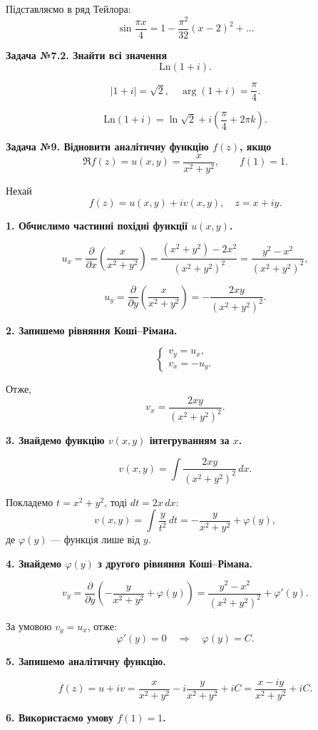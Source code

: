 \documentclass[12pt,a4paper]{article}
\begin{document}
Підставляємо в ряд Тейлора:
\[
\sin\frac{\pi x}{4}
=
1
-\frac{\pi^2}{32}(x-2)^2
+\dots
\]


\textbf{Задача №7.2. Знайти всі значення}
\[
\mathrm{Ln}(1+i).
\]

\[
|1+i|=\sqrt2,\quad \arg(1+i)=\frac{\pi}{4}.
\]

\[
\mathrm{Ln}(1+i)=\ln\sqrt2+i\left(\frac{\pi}{4}+2\pi k\right).
\]

\textbf{Задача №9. Відновити аналітичну функцію \(f(z)\), якщо}
\[
\Re f(z)=u(x,y)=\frac{x}{x^2+y^2}, \qquad f(1)=1.
\]

Нехай
\[
f(z)=u(x,y)+iv(x,y),
\quad z=x+iy.
\]

\textbf{1. Обчислимо частинні похідні функції \(u(x,y)\).}

\[
u_x=\frac{\partial}{\partial x}\!\left(\frac{x}{x^2+y^2}\right)
=\frac{(x^2+y^2)-2x^2}{(x^2+y^2)^2}
=\frac{y^2-x^2}{(x^2+y^2)^2},
\]

\[
u_y=\frac{\partial}{\partial y}\!\left(\frac{x}{x^2+y^2}\right)
=-\frac{2xy}{(x^2+y^2)^2}.
\]

\textbf{2. Запишемо рівняння Коші–Рімана.}

\[
\begin{cases}
v_y=u_x,\\
v_x=-u_y.
\end{cases}
\]

Отже,
\[
v_x=\frac{2xy}{(x^2+y^2)^2}.
\]

\textbf{3. Знайдемо функцію \(v(x,y)\) інтегруванням за \(x\).}

\[
v(x,y)=\int \frac{2xy}{(x^2+y^2)^2}\,dx.
\]

Покладемо \(t=x^2+y^2\), тоді \(dt=2x\,dx\):
\[
v(x,y)=\int \frac{y}{t^2}\,dt
=-\frac{y}{x^2+y^2}+\varphi(y),
\]
де \(\varphi(y)\) — функція лише від \(y\).

\textbf{4. Знайдемо \(\varphi(y)\) з другого рівняння Коші–Рімана.}

\[
v_y=\frac{\partial}{\partial y}
\left(-\frac{y}{x^2+y^2}+\varphi(y)\right)
=\frac{y^2-x^2}{(x^2+y^2)^2}+\varphi'(y).
\]

За умовою \(v_y=u_x\), отже:
\[
\varphi'(y)=0 \quad \Rightarrow \quad \varphi(y)=C.
\]

\textbf{5. Запишемо аналітичну функцію.}

\[
f(z)=u+iv
=\frac{x}{x^2+y^2}-i\frac{y}{x^2+y^2}+iC
=\frac{x-iy}{x^2+y^2}+iC.
\]

\textbf{6. Використаємо умову \(f(1)=1\).}
\end{document}
